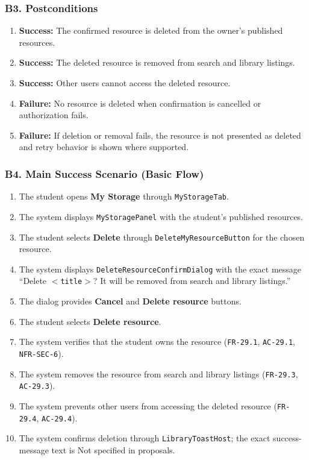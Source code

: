 \documentclass[12pt]{article}
\begin{document}
\hypertarget{sec:b3-postconditions}{}
\subsubsection*{B3. Postconditions}
\par\medskip

\begin{enumerate}
\item \textbf{Success:} The confirmed resource is deleted from the owner's published resources.
\item \textbf{Success:} The deleted resource is removed from search and library listings.
\item \textbf{Success:} Other users cannot access the deleted resource.
\item \textbf{Failure:} No resource is deleted when confirmation is cancelled or authorization fails.
\item \textbf{Failure:} If deletion or removal fails, the resource is not presented as deleted and retry behavior is shown where supported.
\end{enumerate}
\par\medskip

\hypertarget{sec:b4-main-success-scenario-basic-flow}{}
\subsubsection*{B4. Main Success Scenario (Basic Flow)}
\par\medskip

\begin{enumerate}
\item The student opens \textbf{My Storage} through \texttt{MyStorageTab}.
\item The system displays \texttt{MyStoragePanel} with the student's published resources.
\item The student selects \textbf{Delete} through \texttt{DeleteMyResourceButton} for the chosen resource.
\item The system displays \texttt{DeleteResourceConfirmDialog} with the exact message “Delete \texttt{$<$title$>$}? It will be removed from search and library listings.”
\item The dialog provides \textbf{Cancel} and \textbf{Delete resource} buttons.
\item The student selects \textbf{Delete resource}.
\item The system verifies that the student owns the resource (\texttt{FR-29.1}, \texttt{AC-29.1}, \texttt{NFR-SEC-6}).
\item The system removes the resource from search and library listings (\texttt{FR-29.3}, \texttt{AC-29.3}).
\item The system prevents other users from accessing the deleted resource (\texttt{FR-29.4}, \texttt{AC-29.4}).
\item The system confirms deletion through \texttt{LibraryToastHost}; the exact success-message text is Not specified in proposals.
\end{enumerate}
\par\medskip
\end{document}
